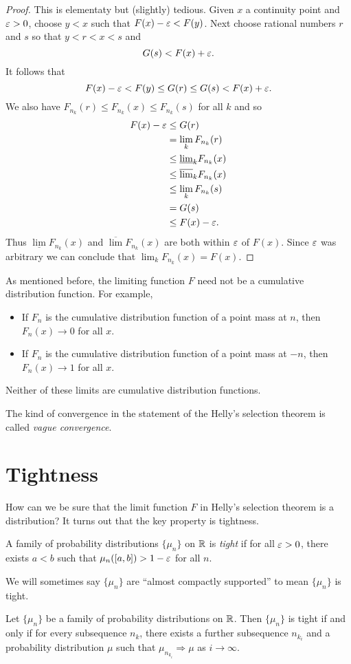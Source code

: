 \begin{proof}
    This is elementaty but (slightly) tedious. Given $x$ a continuity point and $\varepsilon > 0$, choose $y < x$ such that $F(x)-\varepsilon < F(y)$. Next choose rational numbers $r$ and $s$ so that $y < r< x< s$ and
    \[G(s) < F(x)+\varepsilon. \]
    It follows that 
    \[F(x)-\varepsilon < F(y)\le G(r) \le G(s) < F(x)+\varepsilon. \]
    We also have $F_{n_k}(r) \le F_{n_k}(x)\le F_{n_k}(s)$ for all $k$ and so
    \begin{align*}
        F(x)-\varepsilon&\le G(r)\\
         &=\lim_k F_{n_k}(r)\\
        &\le \underline{\lim}_k F_{n_k}(x)\\
        & \le \overline{\lim}_k F_{n_k}(x)\\
        & \le \lim_k F_{n_k}(s)\\
        &= G(s)\\
        &\le F(x)-\varepsilon.
    \end{align*}
    Thus $\underline{\lim}F_{n_k}(x)$ and $\overline{\lim}F_{n_k}(x)$ are both within $\varepsilon$ of $F(x)$. Since $\varepsilon$ was arbitrary we can conclude that $\lim_k F_{n_k}(x)=F(x)$.
\end{proof}
\begin{ex}
    As mentioned before, the limiting function $F$ need not be a cumulative distribution function. For example,
    \begin{itemize}
        \item If $F_n$ is the cumulative distribution function of a point mass at $n$, then $F_n(x) \to 0$ for all $x$.
        \item If $F_n$ is the cumulative distribution function of a point mass at $-n$, then $F_n(x) \to 1$ for all $x$.
    \end{itemize}
    Neither of these limits are cumulative distribution functions.
\end{ex}
The kind of convergence in the statement of the Helly's selection theorem is called \emph{vague convergence}.
\section{Tightness}
How can we be sure that the limit function $F$ in Helly's selection theorem is a distribution? It turns out that the key property is tightness.
\begin{defn}
A family of probability distributions $\{\mu_n\}$ on ${\mathbb R}$ is \emph{tight} if for all $\varepsilon > 0$, there exists $a < b$ such that $\mu_n([a,b]) >1-\varepsilon$ for all $n$. 
\end{defn}
We will sometimes say $\{\mu_n\}$ are ``almost compactly supported'' to mean $\{\mu_n\}$ is tight.
\begin{thrm}
    Let $\{\mu_n\}$ be a family of probability distributions on ${\mathbb R}$. Then $\{\mu_n\}$ is tight if and only if for every subsequence $n_k$, there exists a further subsequence $n_{k_i}$ and a probability distribution $\mu$ such that $\mu_{n_{k_i}} \Rightarrow \mu$ as $i \to \infty$.
\end{thrm}

